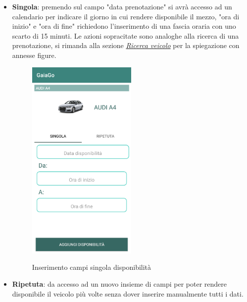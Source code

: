\begin{itemize}
	\item \textbf{Singola}: premendo sul campo "data prenotazione" si avrà accesso ad un calendario per indicare il giorno in cui rendere disponibile il mezzo, "ora di inizio" e "ora di fine" richiedono l'inserimento di una fascia oraria con uno scarto di 15 minuti.
	Le azioni sopracitate sono analoghe alla ricerca di una prenotazione, si rimanda alla sezione \textit{\hyperref[sec:hello]{Ricerca veicolo}} per la spiegazione con annesse figure.
	\begin{figure}[H] 
		\centering 
		\includegraphics[width=0.5\textwidth]{res/images/aggiungi_disponibilita2.png}\\
		\caption{Inserimento campi singola disponibilità}
		\label{campi disponibilità}
	\end{figure}
	\pagebreak
	\item \textbf{Ripetuta}: da accesso ad un nuovo insieme di campi per poter rendere disponibile il veicolo più volte senza dover inserire manualmente tutti i dati. 
	\begin{figure}[H] 
		\centering 

\end{figure}
\end{itemize}
